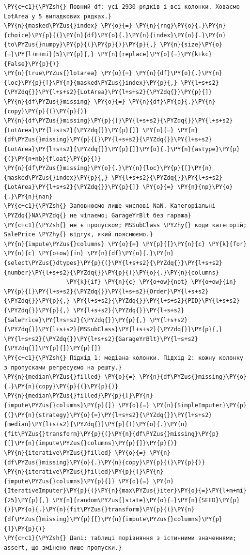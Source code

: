 \begin{Verbatim}[commandchars=\\\{\}]
\PY{c+c1}{\PYZsh{} Повний df: усі 2930 рядків і всі колонки. Ховаємо LotArea у 5 випадкових рядках.}
\PY{n}{masked\PYZus{}index} \PY{o}{=} \PY{n}{rng}\PY{o}{.}\PY{n}{choice}\PY{p}{(}\PY{n}{df}\PY{o}{.}\PY{n}{index}\PY{o}{.}\PY{n}{to\PYZus{}numpy}\PY{p}{(}\PY{p}{)}\PY{p}{,} \PY{n}{size}\PY{o}{=}\PY{l+m+mi}{5}\PY{p}{,} \PY{n}{replace}\PY{o}{=}\PY{k+kc}{False}\PY{p}{)}
\PY{n}{true\PYZus{}lotarea} \PY{o}{=} \PY{n}{df}\PY{o}{.}\PY{n}{loc}\PY{p}{[}\PY{n}{masked\PYZus{}index}\PY{p}{,} \PY{l+s+s2}{\PYZdq{}}\PY{l+s+s2}{LotArea}\PY{l+s+s2}{\PYZdq{}}\PY{p}{]}
\PY{n}{df\PYZus{}missing} \PY{o}{=} \PY{n}{df}\PY{o}{.}\PY{n}{copy}\PY{p}{(}\PY{p}{)}
\PY{n}{df\PYZus{}missing}\PY{p}{[}\PY{l+s+s2}{\PYZdq{}}\PY{l+s+s2}{LotArea}\PY{l+s+s2}{\PYZdq{}}\PY{p}{]} \PY{o}{=} \PY{n}{df\PYZus{}missing}\PY{p}{[}\PY{l+s+s2}{\PYZdq{}}\PY{l+s+s2}{LotArea}\PY{l+s+s2}{\PYZdq{}}\PY{p}{]}\PY{o}{.}\PY{n}{astype}\PY{p}{(}\PY{n+nb}{float}\PY{p}{)}
\PY{n}{df\PYZus{}missing}\PY{o}{.}\PY{n}{loc}\PY{p}{[}\PY{n}{masked\PYZus{}index}\PY{p}{,} \PY{l+s+s2}{\PYZdq{}}\PY{l+s+s2}{LotArea}\PY{l+s+s2}{\PYZdq{}}\PY{p}{]} \PY{o}{=} \PY{n}{np}\PY{o}{.}\PY{n}{nan}
\PY{c+c1}{\PYZsh{} Заповнюємо лише числові NaN. Категоріальні \PYZdq{}NA\PYZdq{} не чіпаємо; GarageYrBlt без гаража}
\PY{c+c1}{\PYZsh{} не є пропуском; MSSubClass \PYZhy{} коди категорій; SalePrice \PYZhy{} відгук, який пояснюємо.}
\PY{n}{impute\PYZus{}columns} \PY{o}{=} \PY{p}{[}\PY{n}{c} \PY{k}{for} \PY{n}{c} \PY{o+ow}{in} \PY{n}{df}\PY{o}{.}\PY{n}{select\PYZus{}dtypes}\PY{p}{(}\PY{l+s+s2}{\PYZdq{}}\PY{l+s+s2}{number}\PY{l+s+s2}{\PYZdq{}}\PY{p}{)}\PY{o}{.}\PY{n}{columns}
                  \PY{k}{if} \PY{n}{c} \PY{o+ow}{not} \PY{o+ow}{in} \PY{p}{[}\PY{l+s+s2}{\PYZdq{}}\PY{l+s+s2}{Order}\PY{l+s+s2}{\PYZdq{}}\PY{p}{,} \PY{l+s+s2}{\PYZdq{}}\PY{l+s+s2}{PID}\PY{l+s+s2}{\PYZdq{}}\PY{p}{,} \PY{l+s+s2}{\PYZdq{}}\PY{l+s+s2}{SalePrice}\PY{l+s+s2}{\PYZdq{}}\PY{p}{,} \PY{l+s+s2}{\PYZdq{}}\PY{l+s+s2}{MSSubClass}\PY{l+s+s2}{\PYZdq{}}\PY{p}{,} \PY{l+s+s2}{\PYZdq{}}\PY{l+s+s2}{GarageYrBlt}\PY{l+s+s2}{\PYZdq{}}\PY{p}{]}\PY{p}{]}
\PY{c+c1}{\PYZsh{} Підхід 1: медіана колонки. Підхід 2: кожну колонку з пропусками регресуємо на решту.}
\PY{n}{median\PYZus{}filled} \PY{o}{=} \PY{n}{df\PYZus{}missing}\PY{o}{.}\PY{n}{copy}\PY{p}{(}\PY{p}{)}
\PY{n}{median\PYZus{}filled}\PY{p}{[}\PY{n}{impute\PYZus{}columns}\PY{p}{]} \PY{o}{=} \PY{n}{SimpleImputer}\PY{p}{(}\PY{n}{strategy}\PY{o}{=}\PY{l+s+s2}{\PYZdq{}}\PY{l+s+s2}{median}\PY{l+s+s2}{\PYZdq{}}\PY{p}{)}\PY{o}{.}\PY{n}{fit\PYZus{}transform}\PY{p}{(}\PY{n}{df\PYZus{}missing}\PY{p}{[}\PY{n}{impute\PYZus{}columns}\PY{p}{]}\PY{p}{)}
\PY{n}{iterative\PYZus{}filled} \PY{o}{=} \PY{n}{df\PYZus{}missing}\PY{o}{.}\PY{n}{copy}\PY{p}{(}\PY{p}{)}
\PY{n}{iterative\PYZus{}filled}\PY{p}{[}\PY{n}{impute\PYZus{}columns}\PY{p}{]} \PY{o}{=} \PY{n}{IterativeImputer}\PY{p}{(}\PY{n}{max\PYZus{}iter}\PY{o}{=}\PY{l+m+mi}{25}\PY{p}{,} \PY{n}{random\PYZus{}state}\PY{o}{=}\PY{n}{SEED}\PY{p}{)}\PY{o}{.}\PY{n}{fit\PYZus{}transform}\PY{p}{(}\PY{n}{df\PYZus{}missing}\PY{p}{[}\PY{n}{impute\PYZus{}columns}\PY{p}{]}\PY{p}{)}
\PY{c+c1}{\PYZsh{} Далі: таблиці порівняння з істинними значеннями; assert, що змінено лише пропуски.}
\end{Verbatim}
